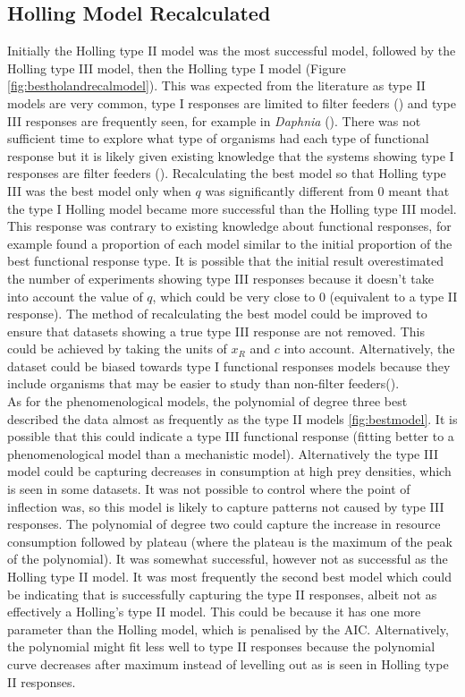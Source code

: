 \documentclass{article}
\begin{document}
\subsection{Holling Model Recalculated}
Initially the Holling type II model was the most successful model, followed by the Holling type III model, then the Holling type I model (Figure \ref{fig:bestholandrecalmodel}). This was expected from the literature as type II models are very common, type I responses are limited to filter feeders (\cite{Jeschke2004Consumer-foodFeeders}) and type III responses are frequently seen, for example in \textit{Daphnia} (\cite{Sarnelle2008TypeDaphnia}). There was not sufficient time to explore what type of organisms had each type of functional response but it is likely given existing knowledge that the systems showing type I responses are filter feeders (\cite{Jeschke2004Consumer-foodFeeders}). Recalculating the best model so that Holling type III was the best model only when $q$ was significantly different from $0$ meant that the type I Holling model became more successful than the Holling type III model. This response was contrary to existing knowledge about functional responses, for example \cite{Dunn2020PredatorHabitats} found a proportion of each model similar to the initial proportion of the best functional response type. It is possible that the initial result overestimated the number of experiments showing type III responses because it doesn't take into account the value of $q$, which could be very close to $0$ (equivalent to a type II response). The method of recalculating the best model could be improved to ensure that datasets showing a true type III response are not removed. This could be achieved by taking the units of $x_R$ and $c$ into account. Alternatively, the dataset could be biased towards type I functional responses models because they include organisms that may be easier to study than non-filter feeders(\cite{Jeschke2004Consumer-foodFeeders}).
\\
As for the phenomenological models, the polynomial of degree three best described the data almost as frequently as the type II models \ref{fig:bestmodel}. It is possible that this could indicate a type III functional response (fitting better to a phenomenological model than a mechanistic model). Alternatively the type III model could be capturing decreases in consumption at high prey densities, which is seen in some datasets. It was not possible to control where the point of inflection was, so this model is likely to capture patterns not caused by type III responses. The polynomial of degree two could capture the increase in resource consumption followed by plateau (where the plateau is the maximum of the peak of the polynomial). It was somewhat successful, however not as successful as the Holling type II model. It was most frequently the second best model which could be indicating that is successfully capturing the type II responses, albeit not as effectively a Holling's type II model. This could be because it has one more parameter than the Holling model, which is penalised by the AIC. Alternatively, the polynomial might fit less well to type II responses because the polynomial curve decreases after maximum instead of levelling out as is seen in Holling type II responses. 
\end{document}
